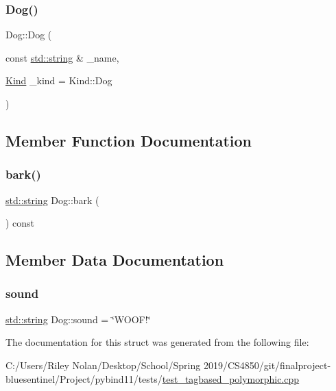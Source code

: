 \subsubsection{\texorpdfstring{Dog()}{Dog()}}
{\footnotesize\ttfamily Dog\+::\+Dog (\begin{DoxyParamCaption}\item[{const \mbox{\hyperlink{_s_d_l__opengl__glext_8h_ab4ccfaa8ab0e1afaae94dc96ef52dde1}{std\+::string}} \&}]{\+\_\+name,  }\item[{\mbox{\hyperlink{struct_animal_abd6bed3bf6361cc3dc37c03f297e3f48}{Kind}}}]{\+\_\+kind = {\ttfamily Kind\+:\+:Dog} }\end{DoxyParamCaption})\hspace{0.3cm}{\ttfamily [inline]}}



\subsection{Member Function Documentation}
\mbox{\label{struct_dog_ae958f57f90e9c9b7d17a184e27ef0b5c}} 
\subsubsection{\texorpdfstring{bark()}{bark()}}
{\footnotesize\ttfamily \mbox{\hyperlink{_s_d_l__opengl__glext_8h_ab4ccfaa8ab0e1afaae94dc96ef52dde1}{std\+::string}} Dog\+::bark (\begin{DoxyParamCaption}{ }\end{DoxyParamCaption}) const\hspace{0.3cm}{\ttfamily [inline]}}



\subsection{Member Data Documentation}
\mbox{\label{struct_dog_a7fa040f0b70c21193ac4386f393df5b6}} 
\subsubsection{\texorpdfstring{sound}{sound}}
{\footnotesize\ttfamily \mbox{\hyperlink{_s_d_l__opengl__glext_8h_ab4ccfaa8ab0e1afaae94dc96ef52dde1}{std\+::string}} Dog\+::sound = \char`\"{}W\+O\+O\+F!\char`\"{}}



The documentation for this struct was generated from the following file\+:\begin{DoxyCompactItemize}
\item 
C\+:/\+Users/\+Riley Nolan/\+Desktop/\+School/\+Spring 2019/\+C\+S4850/git/finalproject-\/bluesentinel/\+Project/pybind11/tests/\mbox{\hyperlink{test__tagbased__polymorphic_8cpp}{test\+\_\+tagbased\+\_\+polymorphic.\+cpp}}\end{DoxyCompactItemize}
